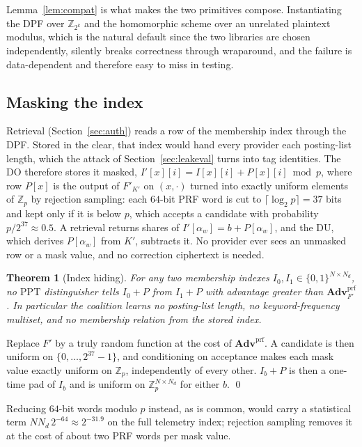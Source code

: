 \documentclass[a4paper,fleqn]{cas-sc}
\newif\ifauthorchecks
\newcommand{\authorcheck}[1]{\ifauthorchecks{\color{red}\textsf{[Authors: #1]}}\fi}
\newtheorem{theorem}{Theorem}
\newcommand{\PPT}{\mathrm{PPT}}
\newcommand{\advPRF}{\mathbf{Adv}^{\mathrm{prf}}}
\begin{document}
Lemma~\ref{lem:compat} is what makes the two primitives compose. Instantiating
the DPF over $\mathbb{Z}_{2^k}$ and the homomorphic scheme over an unrelated
plaintext modulus, which is the natural default since the two libraries are
chosen independently, silently breaks correctness through wraparound, and the
failure is data-dependent and therefore easy to miss in testing.

\subsection{Masking the index}
\label{sec:mask}
Retrieval (Section~\ref{sec:auth}) reads a row of the membership index through
the DPF. Stored in the clear, that index would hand every provider each
posting-list length, which the attack of Section~\ref{sec:leakeval} turns into
tag identities. The DO therefore stores it masked,
$I'[x][i]=I[x][i]+P[x][i]\bmod p$, where row $P[x]$ is the output of
$F'_{K'}$ on $(x,\cdot)$ turned into exactly uniform elements of
$\mathbb{Z}_p$ by rejection sampling: each $64$-bit PRF word is cut to
$\lceil\log_2 p\rceil=37$ bits and kept only if it is below $p$, which accepts
a candidate with probability $p/2^{37}\approx0.5$. A retrieval returns shares
of $I'[\alpha_w]=b+P[\alpha_w]$, and the DU, which derives $P[\alpha_w]$ from
$K'$, subtracts it. No provider ever sees an unmasked row or a mask value, and
no correction ciphertext is needed.

\begin{theorem}[Index hiding]
\label{thm:mask}
For any two membership indexes $I_0,I_1\in\{0,1\}^{N\times N_d}$, no $\PPT$
distinguisher tells $I_0+P$ from $I_1+P$ with advantage greater than
$\advPRF_{F'}$. In particular the coalition learns no posting-list length, no
keyword-frequency multiset, and no membership relation from the stored index.
\end{theorem}
\begin{pf}
Replace $F'$ by a truly random function at the cost of $\advPRF$. A candidate
is then uniform on $\{0,\dots,2^{37}-1\}$, and conditioning on acceptance makes
each mask value exactly uniform on $\mathbb{Z}_p$, independently of every
other. $I_b+P$ is then a one-time pad of $I_b$ and is uniform on
$\mathbb{Z}_p^{N\times N_d}$ for either $b$. \qed
\end{pf}

Reducing $64$-bit words modulo $p$ instead, as is common, would carry a
statistical term $N N_d\,2^{-64}\approx2^{-31.9}$ on the full
telemetry index; rejection sampling removes it at the cost of about two PRF
words per mask value. \authorcheck{The C++ prototype still reduces 64-bit
words; port the rejection sampler of the reference implementation
(crshe/prg.py) before re-running Section~\ref{sec:leakeval}.}
\end{document}
